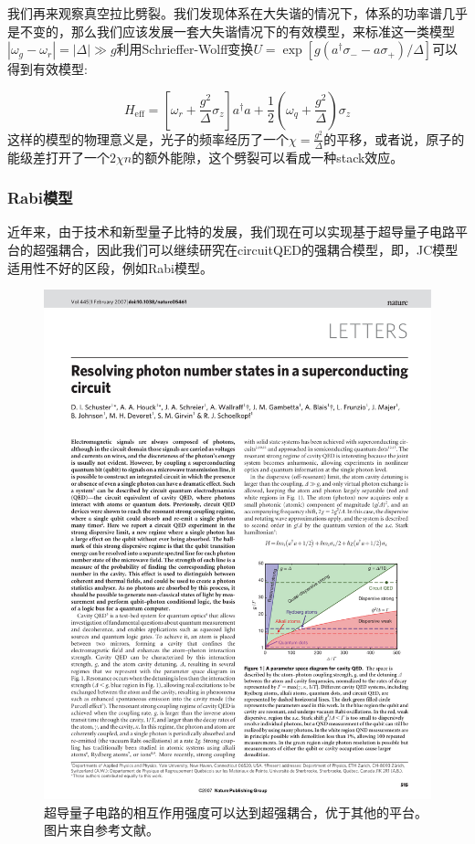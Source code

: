 \documentclass[supercite]{HustGraduPaper}
\begin{document}
我们再来观察真空拉比劈裂。我们发现体系在大失谐的情况下，体系的功率谱几乎是不变的，那么我们应该发展一套大失谐情况下的有效模型，来标准这一类模型$|\omega_g -\omega_r| = |\Delta| \gg g$利用Schrieffer-Wolff变换$U = \exp [g(a^\dagger \sigma_- - a \sigma_+)/\Delta]$可以得到有效模型:

\begin{equation}
H_{\text{eff}} = [\omega_r + \frac{g^2}{\Delta} \sigma_z] a^\dagger a + \frac{1}{2}(\omega_q + \frac{g^2}{\Delta})\sigma_z
\end{equation}
这样的模型的物理意义是，光子的频率经历了一个$\chi = \frac{g^2}{\Delta}$的平移，或者说，原子的能级差打开了一个$2\chi n$的额外能隙，这个劈裂可以看成一种stack效应。

 \subsubsection{Rabi模型}
 近年来，由于技术和新型量子比特的发展，我们现在可以实现基于超导量子电路平台的超强耦合\cite{wallraff2004strong}，因此我们可以继续研究在circuitQED的强耦合模型，即，JC模型适用性不好的区段，例如Rabi模型。
	   
	   \begin{figure}
	   	\centering
	   	\includegraphics[width=0.9\linewidth]{Figures/review/Schuster}
	   	\caption{超导量子电路的相互作用强度可以达到超强耦合，优于其他的平台。图片来自参考文献\cite{GU20171}。}
	   	\label{fig:schuster}
	   \end{figure}
   
\end{document}
